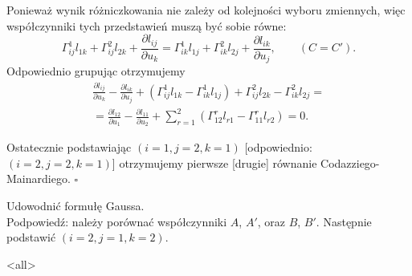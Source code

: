 \begin{frame}[<+->]

Ponieważ wynik różniczkowania nie zależy od kolejności wyboru zmiennych, więc współczynniki tych przedstawień muszą być sobie równe:
\[\Gamma^1_{ij}l_{1k}+\Gamma^2_{ij}l_{2k}+\frac{\partial l_{ij}}{\partial u_k}=\Gamma^1_{ik}l_{1j}+\Gamma^2_{ik}l_{2j}+\frac{\partial l_{ik}}{\partial u_j}, \qquad (C=C'). \]
\pause Odpowiednio grupując otrzymujemy
\begin{multline*}
\frac{\partial l_{ij}}{\partial u_k}-\frac{\partial l_{ik}}{\partial u_j}+\left(\Gamma^1_{ij}l_{1k}-\Gamma^1_{ik}l_{1j}\right)+\Gamma^2_{ij}l_{2k} -\Gamma^2_{ik}l_{2j}=\\
=\frac{\partial l_{12}}{\partial u_1}-\frac{\partial l_{11}}{\partial u_2} + 
\sum_{r=1}^2 \left( \Gamma^r_{12}l_{r1}-\Gamma^r_{11}l_{r2}\right)=0.
\end{multline*}


\pause Ostatecznie podstawiając $(i=1,j=2,k=1)$ [odpowiednio: $(i=2,j=2,k=1)$] otrzymujemy pierwsze [drugie] równanie Codazziego-Mainardiego. 
\hfill $\square$

\end{frame}
\begin{frame}[<+->]
\begin{exercise}
Udowodnić formułę Gaussa. \\
\footnotesize{Podpowiedź: należy porównać współczynniki $A$, $A'$, oraz  $B$,  $B'$.  Następnie podstawić $(i=2,j=1,k=2)$.}
\end{exercise}


\end{frame}
\mode<all>{}

